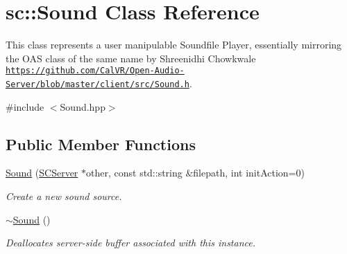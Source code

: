 \hypertarget{classsc_1_1Sound}{\section{sc\-:\-:Sound Class Reference}
\label{classsc_1_1Sound}
}


This class represents a user manipulable Soundfile Player, essentially mirroring the O\-A\-S class of the same name by Shreenidhi Chowkwale  \href{https://github.com/CalVR/Open-Audio-Server/blob/master/client/src/Sound.h}{\tt https\-://github.\-com/\-Cal\-V\-R/\-Open-\/\-Audio-\/\-Server/blob/master/client/src/\-Sound.\-h}.  




{\ttfamily \#include $<$Sound.\-hpp$>$}

\subsection*{Public Member Functions}
\begin{DoxyCompactItemize}
\item 
\hypertarget{classsc_1_1Sound_a658cbf07e4afe2f9b0429a070a17d339}{\hyperlink{classsc_1_1Sound_a658cbf07e4afe2f9b0429a070a17d339}{Sound} (\hyperlink{classsc_1_1SCServer}{S\-C\-Server} $\ast$other, const std\-::string \&filepath, int init\-Action=0)}\label{classsc_1_1Sound_a658cbf07e4afe2f9b0429a070a17d339}

\begin{DoxyCompactList}\small\item\em Create a new sound source. \end{DoxyCompactList}\item 
\hypertarget{classsc_1_1Sound_ac05e395b00c36c796bb8aa707d1011af}{\hyperlink{classsc_1_1Sound_ac05e395b00c36c796bb8aa707d1011af}{$\sim$\-Sound} ()}\label{classsc_1_1Sound_ac05e395b00c36c796bb8aa707d1011af}

\begin{DoxyCompactList}\small\item\em Deallocates server-\/side buffer associated with this instance. \end{DoxyCompactList}\end{DoxyCompactItemize}
